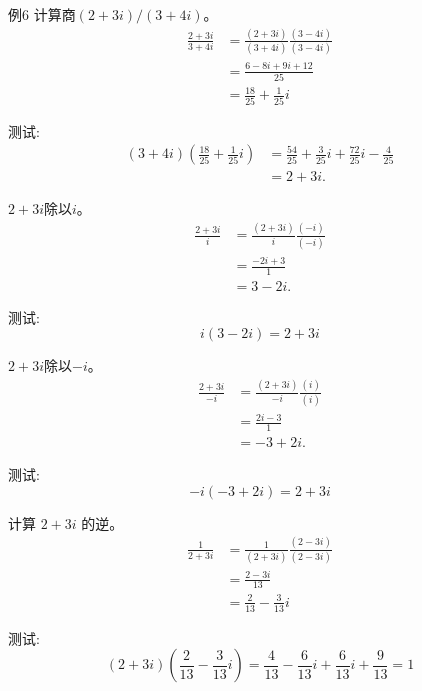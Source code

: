\begin{example}
    例6 计算商$(2+ 3i) /(3+ 4i)$。
    $$
    \begin{aligned}
    \frac{2+3 i}{3+4 i} & =\frac{(2+3 i)}{(3+4 i)} \frac{(3-4 i)}{(3-4 i)} \\
    & =\frac{6-8 i+9 i+12}{25} \\
    & =\frac{18}{25}+\frac{1}{25} i
    \end{aligned}
    $$
    
    测试:
    $$
    \begin{aligned}
    (3+4 i)\left(\frac{18}{25}+\frac{1}{25} i\right) & =\frac{54}{25}+\frac{3}{25} i+\frac{72}{25} i-\frac{4}{25} \\
    & =2+3 i .
    \end{aligned}
    $$
\end{example}

\begin{example}
    $2+3 i$除以$i$。
    $$
    \begin{aligned}
    \frac{2+3 i}{i} & =\frac{(2+3 i)}{i} \frac{(-i)}{(-i)} \\
    & =\frac{-2 i+3}{1} \\
    & =3-2 i .
    \end{aligned}
    $$
    
    测试:
    $$
    i(3-2 i)=2+3 i
    $$
\end{example}

\begin{example}
    $2+3 i$除以$-i$。
    $$
    \begin{aligned}
    \frac{2+3 i}{-i} & =\frac{(2+3 i)}{-i} \frac{(i)}{(i)} \\
    & =\frac{2 i-3}{1} \\
    & =-3+2 i .
    \end{aligned}
    $$
    
    测试:
    $$
    -i(-3+2 i)=2+3 i
    $$
\end{example}

\begin{example}
    计算 $2+3 i$ 的逆。
    $$
    \begin{aligned}
    \frac{1}{2+3 i} & =\frac{1}{(2+3 i)} \frac{(2-3 i)}{(2-3 i)} \\
    & =\frac{2-3 i}{13} \\
    & =\frac{2}{13}-\frac{3}{13} i
    \end{aligned}
    $$
    
    测试:
    $$
    (2+3 i)\left(\frac{2}{13}-\frac{3}{13} i\right)=\frac{4}{13}-\frac{6}{13} i+\frac{6}{13} i+\frac{9}{13}=1
    $$
\end{example}

